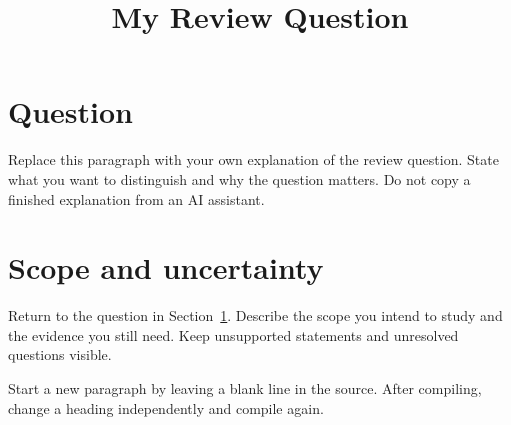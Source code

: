 \documentclass[11pt]{article}
\title{My Review Question}
\author{}
\date{}
\begin{document}
\maketitle

\section{Question}
\label{sec:question}
Replace this paragraph with your own explanation of the review question.
State what you want to distinguish and why the question matters.
Do not copy a finished explanation from an AI assistant.

\section{Scope and uncertainty}
Return to the question in Section~\ref{sec:question}.
Describe the scope you intend to study and the evidence you still need.
Keep unsupported statements and unresolved questions visible.

Start a new paragraph by leaving a blank line in the source.
After compiling, change a heading independently and compile again.

% 
% 
\end{document}
